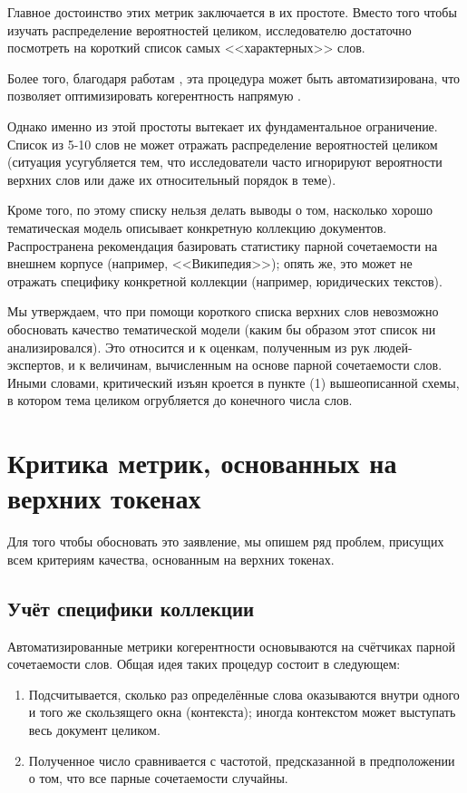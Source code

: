 Главное достоинство этих метрик заключается в их простоте. Вместо того чтобы изучать распределение вероятностей целиком, исследователю достаточно посмотреть на короткий список самых <<характерных>> слов.

Более того, благодаря работам \cite{mrtl,mimno2011,aletras2013evaluating,roder2015exploring}, эта процедура может быть автоматизирована, что позволяет оптимизировать когерентность напрямую \cite{4keys}.

Однако именно из этой простоты вытекает их фундаментальное ограничение. Список из 5-10 слов не может отражать распределение вероятностей целиком (ситуация усугубляется тем, что исследователи часто игнорируют вероятности верхних слов или даже их относительный порядок в теме).

Кроме того, по этому списку нельзя делать выводы о том, насколько хорошо тематическая модель описывает конкретную коллекцию документов. Распространена рекомендация базировать статистику парной сочетаемости на внешнем корпусе (например, <<Википедия>>); опять же, это может не отражать специфику конкретной коллекции (например, юридических текстов).

Мы утверждаем, что при помощи короткого списка верхних слов невозможно обосновать качество тематической модели (каким бы образом этот список ни анализировался). Это относится и к оценкам, полученным из рук людей-экспертов, и к величинам, вычисленным на основе парной сочетаемости слов. Иными словами, критический изъян кроется в пункте (1) вышеописанной схемы, в котором тема целиком огрубляется до конечного числа слов.

\section{Критика метрик, основанных на верхних токенах}


Для того чтобы обосновать это заявление, мы опишем ряд проблем, присущих всем критериям качества, основанным на верхних токенах.

\subsection{Учёт специфики коллекции} \label{sec:corpus_agnostic}

Автоматизированные метрики когерентности основываются на счётчиках парной сочетаемости слов. Общая идея таких процедур состоит в следующем:

\begin{enumerate}
    \item Подсчитывается, сколько раз определённые слова оказываются внутри одного и того же скользящего окна (контекста); иногда контекстом может выступать весь документ целиком.
    \item Полученное число сравнивается с частотой, предсказанной в предположении о том, что все парные сочетаемости случайны.
\end{enumerate}

